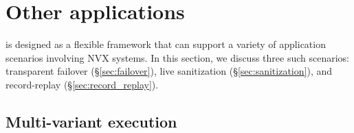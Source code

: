 \chapter{Other applications}
\label{chap:applications}

\nx is designed as a flexible framework that can support a variety of
application scenarios involving NVX systems.  In this section, we
discuss three such scenarios:  transparent failover
(\S\ref{sec:failover}), live sanitization
(\S\ref{sec:sanitization}), and record-replay
(\S\ref{sec:record_replay}).







\section{Multi-variant execution}
\label{sec:multi-variant}

